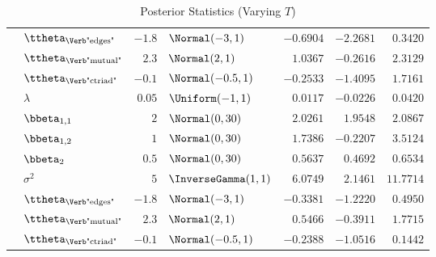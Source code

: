 \begin{table}[t]
\begin{tabular}{cl|rlrrr}
        & $\ttheta_{\text{\Verb"edges"}}$  & $-1.8$ & $\Normal(-3,1)$      & $-0.6904$ & $-2.2681$ & $0.3420$  \\
        & $\ttheta_{\text{\Verb"mutual"}}$ & $2.3$  & $\Normal(2,1)$       & $1.0367$  & $-0.2616$ & $2.3129$  \\
        & $\ttheta_{\text{\Verb"ctriad"}}$ & $-0.1$ & $\Normal(-0.5,1)$    & $-0.2533$ & $-1.4095$ & $1.7161$  \\
		\midrule
        & $\lambda$                        & $0.05$ & $\Uniform(-1,1)$     & $0.0117$  & $-0.0226$ & $0.0420$  \\
        & $\bbeta_{1,1}$                   & $2$    & $\Normal(0,30)$      & $2.0261$  & $1.9548$  & $2.0867$  \\
        & $\bbeta_{1,2}$                   & $1$    & $\Normal(0,30)$      & $1.7386$  & $-0.2207$ & $3.5124$  \\
        & $\bbeta_{2}$                     & $0.5$  & $\Normal(0,30)$      & $0.5637$  & $0.4692$  & $0.6534$  \\
        & $\sigma^2$                       & $5$    & $\InverseGamma(1,1)$ & $6.0749$  & $2.1461$  & $11.7714$ \\
        & $\ttheta_{\text{\Verb"edges"}}$  & $-1.8$ & $\Normal(-3,1)$      & $-0.3381$ & $-1.2220$ & $0.4950$  \\
        & $\ttheta_{\text{\Verb"mutual"}}$ & $2.3$  & $\Normal(2,1)$       & $0.5466$  & $-0.3911$ & $1.7715$  \\
        & $\ttheta_{\text{\Verb"ctriad"}}$ & $-0.1$ & $\Normal(-0.5,1)$    & $-0.2388$ & $-1.0516$ & $0.1442$  \\
		\bottomrule
	\end{tabular}
	\caption{Posterior Statistics (Varying $T$)}
	\label{tab:S-1}
\end{table}
